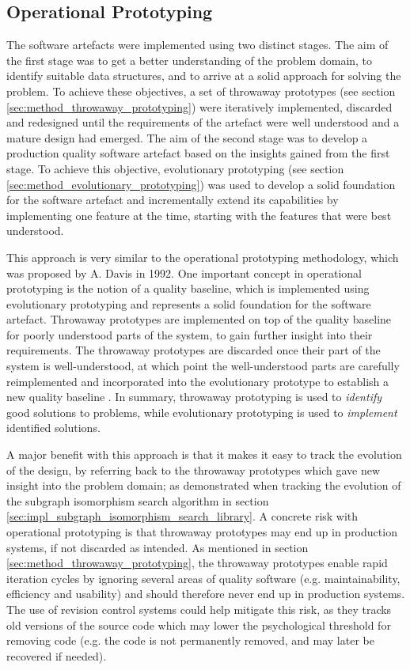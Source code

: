 
\subsection{Operational Prototyping}

The software artefacts were implemented using two distinct stages. The aim of the first stage was to get a better understanding of the problem domain, to identify suitable data structures, and to arrive at a solid approach for solving the problem. To achieve these objectives, a set of throwaway prototypes (see section \ref{sec:method_throwaway_prototyping}) were iteratively implemented, discarded and redesigned until the requirements of the artefact were well understood and a mature design had emerged. The aim of the second stage was to develop a production quality software artefact based on the insights gained from the first stage. To achieve this objective, evolutionary prototyping (see section \ref{sec:method_evolutionary_prototyping}) was used to develop a solid foundation for the software artefact and incrementally extend its capabilities by implementing one feature at the time, starting with the features that were best understood.

This approach is very similar to the operational prototyping methodology, which was proposed by A. Davis in 1992. One important concept in operational prototyping is the notion of a quality baseline, which is implemented using evolutionary prototyping and represents a solid foundation for the software artefact. Throwaway prototypes are implemented on top of the quality baseline for poorly understood parts of the system, to gain further insight into their requirements. The throwaway prototypes are discarded once their part of the system is well-understood, at which point the well-understood parts are carefully reimplemented and incorporated into the evolutionary prototype to establish a new quality baseline \cite{operational_prototyping}. In summary, throwaway prototyping is used to \textit{identify} good solutions to problems, while evolutionary prototyping is used to \textit{implement} identified solutions.

A major benefit with this approach is that it makes it easy to track the evolution of the design, by referring back to the throwaway prototypes which gave new insight into the problem domain; as demonstrated when tracking the evolution of the subgraph isomorphism search algorithm in section \ref{sec:impl_subgraph_isomorphism_search_library}. A concrete risk with operational prototyping is that throwaway prototypes may end up in production systems, if not discarded as intended. As mentioned in section \ref{sec:method_throwaway_prototyping}, the throwaway prototypes enable rapid iteration cycles by ignoring several areas of quality software (e.g. maintainability, efficiency and usability) and should therefore never end up in production systems. The use of revision control systems could help mitigate this risk, as they tracks old versions of the source code which may lower the psychological threshold for removing code (e.g. the code is not permanently removed, and may later be recovered if needed).




